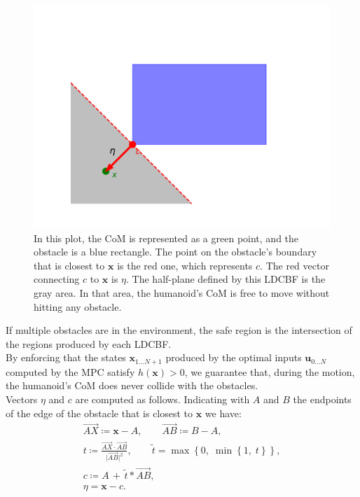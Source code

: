 \documentclass[main.tex]{subfiles}
\begin{document}
\begin{figure}[h]
    \centering
    \includegraphics[width=0.75\linewidth]{figures//MPC/example_lcbf.pdf}
    \caption{In this plot, the CoM is represented as a green point, and the obstacle is a blue rectangle. The point on the obstacle's boundary that is closest to $\mathbf{x}$ is the red one, which represents $c$. The red vector connecting $c$ to $\mathbf{x}$ is $\eta$. The half-plane defined by this LDCBF is the gray area. In that area, the humanoid's CoM is free to move without hitting any obstacle.}
    \label{fig:example_LDCBF}
\end{figure}

If multiple obstacles are in the environment, the safe region is the intersection of the regions produced by each LDCBF.\\
By enforcing that the states $\mathbf{x}_{1...N+1}$ produced by the optimal inputs $\mathbf{u}_{0...N}$ computed by the MPC satisfy $h(\mathbf{x})>0$, we guarantee that, during the motion, the humanoid's CoM does never collide with the obstacles.\\

Vectors $\eta$ and $c$ are computed as follows. Indicating with $A$ and $B$ the endpoints of the edge of the obstacle that is closest to $\mathbf{x}$ we have:
\begin{gather*}
    \overrightarrow{AX} \coloneqq \mathbf{x} - A, \qquad \overrightarrow{AB} \coloneqq B - A, \\
    t \coloneqq \frac{\overrightarrow{AX} \cdot \overrightarrow{AB}}{\lvert \overrightarrow{AB} \rvert ^2}, \qquad \tilde{t} = \max \left\{0,\; \min \left\{ 1,\; t\right\}\right\}, \\
    c \coloneqq A\, +\, \tilde{t}*\overrightarrow{AB}, \\
    \eta = \mathbf{x} - c.
\end{gather*}
\end{document}
